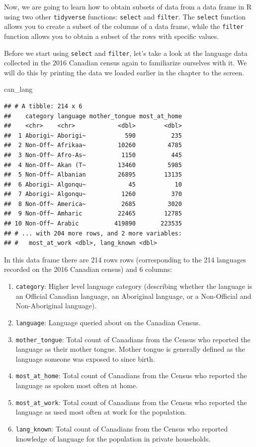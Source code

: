 \documentclass[
]{krantz}
\makeatletter
\newenvironment{Shaded}{\begin{snugshade}}{\end{snugshade}}
\newcommand{\NormalTok}[1]{#1}
\providecommand{\tightlist}{%
  \setlength{\itemsep}{0pt}\setlength{\parskip}{0pt}}
\newenvironment{kframe}{%
\medskip{}
\setlength{\fboxsep}{.8em}
 \def\at@end@of@kframe{}%
 \ifinner\ifhmode%
  \def\at@end@of@kframe{\end{minipage}}%
  \begin{minipage}{\columnwidth}%
 \fi\fi%
 \def\FrameCommand##1{\hskip\@totalleftmargin \hskip-\fboxsep
 \colorbox{shadecolor}{##1}\hskip-\fboxsep
     \hskip-\linewidth \hskip-\@totalleftmargin \hskip\columnwidth}%
 \MakeFramed {\advance\hsize-\width
   \@totalleftmargin\z@ \linewidth\hsize
   \@setminipage}}%
 {\par\unskip\endMakeFramed%
 \at@end@of@kframe}
\renewenvironment{Shaded}{\begin{kframe}}{\end{kframe}}
\makeatother
\begin{document}
Now, we are going to learn how to obtain subsets of data from a data frame in R using two other \texttt{tidyverse} functions: \texttt{select} and \texttt{filter}.
The \texttt{select} function allows you to create a subset of the columns of a data frame, while the \texttt{filter} function allows you to obtain a subset of the rows with specific values.

Before we start using \texttt{select} and \texttt{filter}, let's take a look at the language data collected in the 2016 Canadian census again to familiarize ourselves with it.
We will do this by printing the data we loaded earlier in the chapter to the screen.

\begin{Shaded}
\begin{Highlighting}[]
\NormalTok{can\_lang}
\end{Highlighting}
\end{Shaded}

\begin{verbatim}
## # A tibble: 214 x 6
##    category language mother_tongue most_at_home
##    <chr>    <chr>            <dbl>        <dbl>
##  1 Aborigi~ Aborigi~           590          235
##  2 Non-Off~ Afrikaa~         10260         4785
##  3 Non-Off~ Afro-As~          1150          445
##  4 Non-Off~ Akan (T~         13460         5985
##  5 Non-Off~ Albanian         26895        13135
##  6 Aborigi~ Algonqu~            45           10
##  7 Aborigi~ Algonqu~          1260          370
##  8 Non-Off~ America~          2685         3020
##  9 Non-Off~ Amharic          22465        12785
## 10 Non-Off~ Arabic          419890       223535
## # ... with 204 more rows, and 2 more variables:
## #   most_at_work <dbl>, lang_known <dbl>
\end{verbatim}

In this data frame there are 214 rows rows (corresponding to the 214 languages recorded on the 2016 Canadian census)
and 6 columns:

\begin{enumerate}
\def\labelenumi{\arabic{enumi}.}
\tightlist
\item
  \texttt{category}: Higher level language category (describing whether the language is an Official Canadian language, an Aboriginal language, or a Non-Official and Non-Aboriginal language).
\item
  \texttt{language}: Language queried about on the Canadian Census.
\item
  \texttt{mother\_tongue}: Total count of Canadians from the Census who reported the language as their mother tongue. Mother tongue is generally defined as the language someone was exposed to since birth.
\item
  \texttt{most\_at\_home}: Total count of Canadians from the Census who reported the language as spoken most often at home.
\item
  \texttt{most\_at\_work}: Total count of Canadians from the Census who reported the language as used most often at work for the population.
\item
  \texttt{lang\_known}: Total count of Canadians from the Census who reported knowledge of language for the population in private households.
\end{enumerate}
\end{document}
